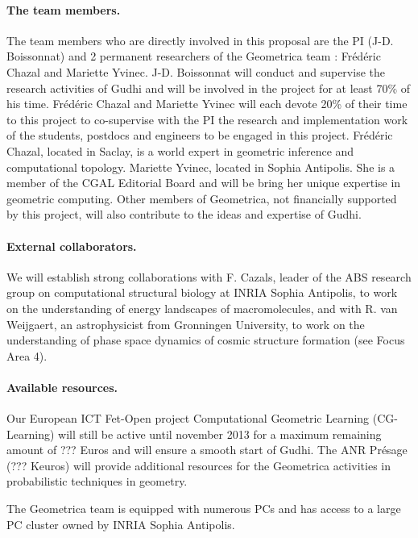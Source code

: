\paragraph{The team members.}
The team members who are directly involved in this proposal are the PI (J-D. Boissonnat) and 2 permanent researchers of the Geometrica team : Fr\'ed\'eric Chazal and Mariette Yvinec.  J-D. Boissonnat will conduct and supervise the research activities of Gudhi and will be involved in the project for at least 70\% of his time.  Fr\'ed\'eric Chazal and Mariette Yvinec will each devote 20\% of their time to this project to co-supervise with the PI the research and implementation work of the students, postdocs and engineers to be engaged in this project. Fr\'ed\'eric Chazal, located in Saclay,  is a world expert in geometric inference and computational topology. Mariette Yvinec, located in Sophia Antipolis. She is a member of the CGAL Editorial Board and will be bring her unique expertise in geometric computing. Other members of Geometrica, not financially supported by this project, will also contribute to the ideas and expertise of Gudhi.

\paragraph{External collaborators.} We will establish  strong collaborations with F. Cazals, leader of the ABS research group on computational structural biology at INRIA Sophia Antipolis, to work on the understanding of energy landscapes of macromolecules,  and with R. van Weijgaert, an astrophysicist from Gronningen University, to work on the understanding of phase space dynamics of cosmic structure formation (see Focus Area 4).

\paragraph{Available resources.} Our European ICT Fet-Open project Computational Geometric Learning (CG-Learning) will still be active until november 2013 for a maximum remaining amount of ??? Euros and will ensure a smooth start of Gudhi.  The ANR Pr\'esage (??? Keuros) will provide additional resources for the Geometrica activities in probabilistic techniques in geometry.

The Geometrica team is equipped with numerous PCs and has access to a large PC cluster owned by INRIA Sophia Antipolis.

